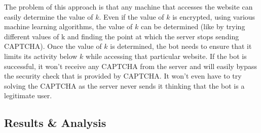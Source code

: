 \documentclass[runningheads,10pt]{llncs}
\begin{document}
\begin{enumerate}
		The problem of this approach is that any machine that accesses the website can easily determine the value of $k$. Even if the value of $k$ is encrypted, using various machine learning algorithms, the value of $k$ can be determined (like by trying different values of k and finding the point at which the server stops sending CAPTCHA). Once the value of $k$ is determined, the bot needs to ensure that it limits its activity below $k$ while accessing that particular website. If the bot is successful, it won't receive any CAPTCHA from the server and will easily bypass the security check that is provided by CAPTCHA. It won't even have to try solving the CAPTCHA as the server never sends it thinking that the bot is a legitimate user.\\


	\end{enumerate}

	\subsection{Results \& Analysis  \label{sec3}}
\end{document}

